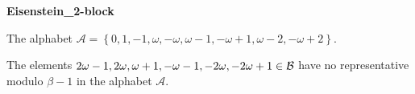 \begin{exmp}
\textbf{ Eisenstein\_2-block }

\label{ex:Eisenstein2-block}

The alphabet $\mathcal{A} =\left\{0, 1, -1, \omega, -\omega, \omega - 1, -\omega + 1, \omega - 2, -\omega + 2\right\}$.

The elements $2\omega - 1, 2\omega, \omega + 1, -\omega - 1, -2\omega, -2\omega + 1 \in\mathcal{B}$ have no representative  modulo $\beta-1$ in the alphabet $\mathcal{A}$.
\end{exmp}
